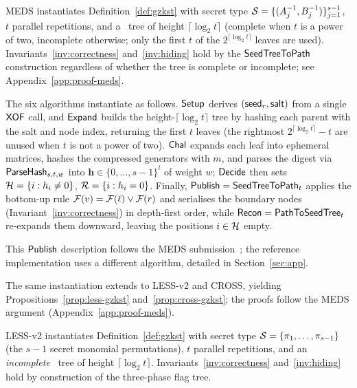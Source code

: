 \begin{proposition}
\label{prop:meds-gzkst}
MEDS instantiates Definition~\ref{def:gzkst} with secret type
$\mathcal{S} = \{(A_j^{-1}, B_j^{-1})\}_{j=1}^{s-1}$,
$t$ parallel repetitions, and a \GGM\ tree of height
$\lceil \log_2 t \rceil$ (complete when $t$ is a power of two,
incomplete otherwise; only the first $t$ of the $2^{\lceil\log_2 t\rceil}$
leaves are used).
Invariants~\ref{inv:correctness} and~\ref{inv:hiding} hold by the
$\mathsf{SeedTreeToPath}$ construction regardless of whether the tree is
complete or incomplete; see Appendix~\ref{app:proof-meds}.
\end{proposition}

The six algorithms instantiate as follows. $\mathsf{Setup}$ derives $(\mathsf{seed}_r,\mathsf{salt})$
from a single $\mathsf{XOF}$ call, and $\mathsf{Expand}$ builds the height-$\lceil\log_2 t\rceil$
tree by hashing each parent with the salt and node index, returning the first
$t$ leaves (the rightmost $2^{\lceil\log_2 t\rceil}-t$ are unused when $t$ is not
a power of two). $\mathsf{Chal}$ expands each leaf into ephemeral
matrices, hashes the compressed generators with $m$, and parses the digest via
$\mathsf{ParseHash}_{s,t,w}$ into $\mathbf{h}\in\{0,\ldots,s-1\}^t$ of weight $w$;
$\mathsf{Decide}$ then sets $\mathcal{H}=\{i:h_i\neq0\}$, $\mathcal{R}=\{i:h_i=0\}$. Finally,
$\mathsf{Publish}=\mathsf{SeedTreeToPath}_t$ applies the bottom-up rule
$\mathcal{F}(v)=\mathcal{F}(\ell)\vee\mathcal{F}(r)$ and serialises the boundary nodes
(Invariant~\ref{inv:correctness}) in depth-first order, while
$\mathsf{Recon}=\mathsf{PathToSeedTree}_t$ re-expands them downward, leaving the positions
$i\in\mathcal{H}$ empty.

\begin{remark}
  This $\mathsf{Publish}$ description follows the MEDS submission~\cite{MEDS_PQC}; the
  reference implementation uses a different algorithm, detailed in
  Section~\ref{sec:app}.
\end{remark}


The same instantiation extends to LESS-v2 and CROSS, yielding
Propositions~\ref{prop:less-gzkst} and~\ref{prop:cross-gzkst}; the proofs
follow the MEDS argument (Appendix~\ref{app:proof-meds}).

\begin{proposition}
\label{prop:less-gzkst}
LESS-v2\cite{LESS-spec} instantiates Definition~\ref{def:gzkst} with secret type
$\mathcal{S} = \{\pi_1, \ldots, \pi_{s-1}\}$ (the $s-1$ secret monomial permutations),
$t$ parallel repetitions, and an \emph{incomplete} \GGM\ tree of height
$\lceil \log_2 t \rceil$.
Invariants~\ref{inv:correctness} and~\ref{inv:hiding} hold by construction
of the three-phase flag tree.
\end{proposition}

